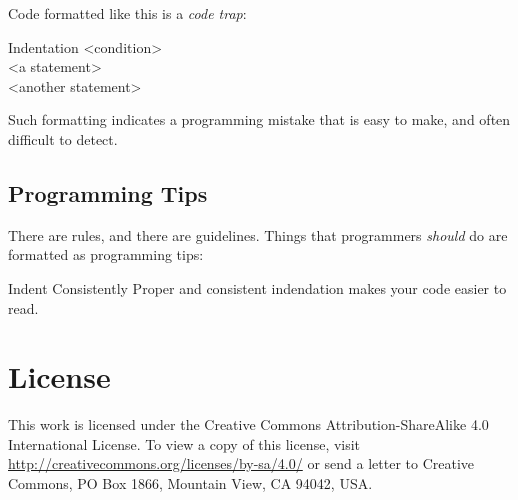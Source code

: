 Code formatted like this is a \textit{code trap}:
\begin{trap*}{Indentation}
<condition>\\
\phantom{xxxx}<a statement>\\
\phantom{xxxx}<another statement>
\end{trap*}

Such formatting indicates a programming mistake that is easy to make, and often difficult to detect.

\subsection*{Programming Tips}

There are rules, and there are guidelines.  Things that programmers \textit{should} do are formatted as programming tips:

\begin{tip*}{Indent Consistently}
    Proper and consistent indendation makes your code easier to read.
\end{tip*}

\section{License}

This work is licensed under the Creative Commons Attribution-ShareAlike 4.0 International License. To view a copy of this license, visit \href{http://creativecommons.org/licenses/by-sa/4.0/}{http://creativecommons.org/licenses/by-sa/4.0/} or send a letter to Creative Commons, PO Box 1866, Mountain View, CA 94042, USA.

